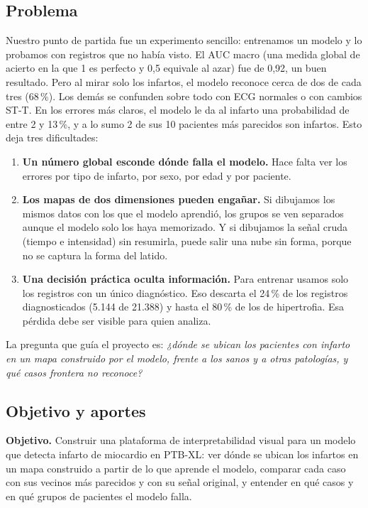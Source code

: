 \documentclass[conference]{IEEEtran}
\begin{document}
\subsection{Problema}
Nuestro punto de partida fue un experimento sencillo: entrenamos un modelo y lo probamos con registros que no había visto. El AUC macro (una medida global de acierto en la que 1 es perfecto y 0,5 equivale al azar) fue de 0,92, un buen resultado. Pero al mirar solo los infartos, el modelo reconoce cerca de dos de cada tres (68\,\%). Los demás se confunden sobre todo con ECG normales o con cambios ST-T. En los errores más claros, el modelo le da al infarto una probabilidad de entre 2 y 13\,\%, y a lo sumo 2 de sus 10 pacientes más parecidos son infartos. Esto deja tres dificultades:
\begin{enumerate}
\item \textbf{Un número global esconde dónde falla el modelo.} Hace falta ver los errores por tipo de infarto, por sexo, por edad y por paciente.
\item \textbf{Los mapas de dos dimensiones pueden engañar.} Si dibujamos los mismos datos con los que el modelo aprendió, los grupos se ven separados aunque el modelo solo los haya memorizado. Y si dibujamos la señal cruda (tiempo e intensidad) sin resumirla, puede salir una nube sin forma, porque no se captura la forma del latido.
\item \textbf{Una decisión práctica oculta información.} Para entrenar usamos solo los registros con un único diagnóstico. Eso descarta el 24\,\% de los registros diagnosticados (5.144 de 21.388) y hasta el 80\,\% de los de hipertrofia. Esa pérdida debe ser visible para quien analiza.
\end{enumerate}

La pregunta que guía el proyecto es: \emph{¿dónde se ubican los pacientes con infarto en un mapa construido por el modelo, frente a los sanos y a otras patologías, y qué casos frontera no reconoce?}

\subsection{Objetivo y aportes}
\textbf{Objetivo.} Construir una plataforma de interpretabilidad visual para un modelo que detecta infarto de miocardio en PTB-XL: ver dónde se ubican los infartos en un mapa construido a partir de lo que aprende el modelo, comparar cada caso con sus vecinos más parecidos y con su señal original, y entender en qué casos y en qué grupos de pacientes el modelo falla.
\end{document}
